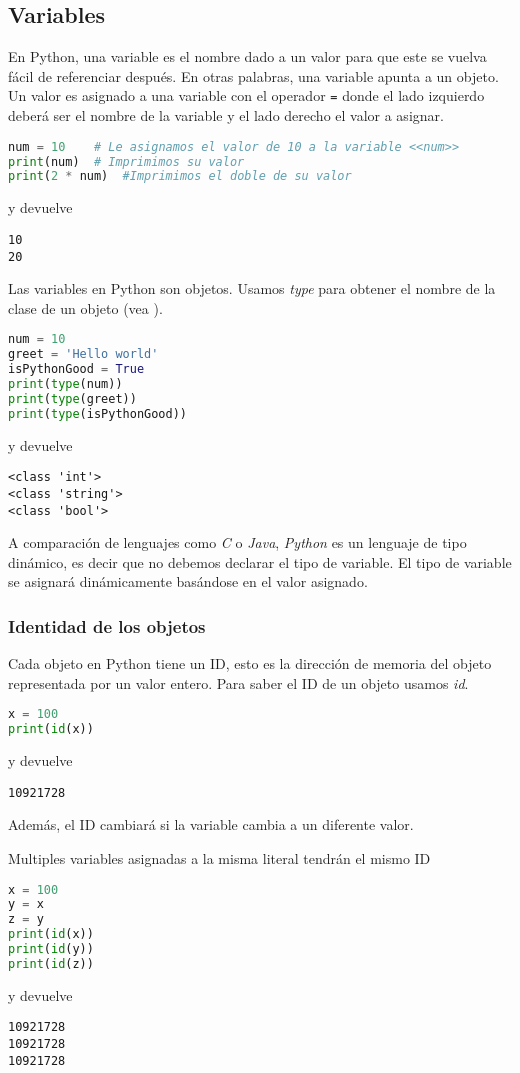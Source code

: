    \subsection{Variables}\label{subsec: variables}
    En Python, una variable es el nombre dado a un valor para que este se vuelva fácil de referenciar después. En otras palabras, una variable apunta a un objeto. Un valor es asignado a una variable con el operador \texttt{=} donde el lado izquierdo deberá ser el nombre de la variable y el lado derecho el valor a asignar.
    \begin{lstlisting}[language={python}]
num = 10    # Le asignamos el valor de 10 a la variable <<num>>
print(num)  # Imprimimos su valor
print(2 * num)  #Imprimimos el doble de su valor
    \end{lstlisting}
    y devuelve
    \begin{lstlisting}[language={[latex]tex}]
10
20
    \end{lstlisting}
    Las variables en Python son objetos. Usamos \emph{type} para obtener el nombre de la clase de un objeto (vea ).
    \begin{lstlisting}[language={python}]
num = 10
greet = 'Hello world'
isPythonGood = True
print(type(num))
print(type(greet))
print(type(isPythonGood))
    \end{lstlisting}
    y devuelve
    \begin{lstlisting}[language={[latex]tex}]
<class 'int'>
<class 'string'>
<class 'bool'>
    \end{lstlisting}
    A comparación de lenguajes como \emph{C} o \emph{Java}, \emph{Python} es un lenguaje de tipo dinámico, es decir que no debemos declarar el tipo de variable. El tipo de variable se asignará dinámicamente basándose en el valor asignado.
    \subsubsection{Identidad de los objetos}\label{subsubsec: id_obj}
    Cada objeto en Python tiene un ID, esto es la dirección de memoria del objeto representada por un valor entero. Para saber el ID de un objeto usamos \emph{id}.
    \begin{lstlisting}[language={python}]
x = 100
print(id(x))
    \end{lstlisting}
    y devuelve
    \begin{lstlisting}[language={[latex]tex}]
10921728
    \end{lstlisting}
    Además, el ID cambiará si la variable cambia a un diferente valor.\par 
    Multiples variables asignadas a la misma literal tendrán el mismo ID
    \begin{lstlisting}[language={python}]
x = 100
y = x
z = y
print(id(x))
print(id(y))
print(id(z))
    \end{lstlisting}
    y devuelve
    \begin{lstlisting}[language={[latex]tex}]
10921728
10921728
10921728
    \end{lstlisting}
